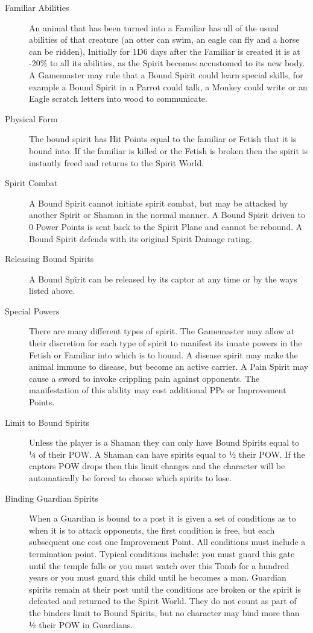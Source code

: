 \begin{rpg-spell}
\begin{description}
\item[Familiar Abilities] An animal that has been turned into a Familiar has all of the usual abilities of that creature (an otter can swim, an eagle can fly and a horse can be ridden), Initially for 1D6 days after the Familiar is created it is at -20\% to all its abilities, as the Spirit becomes accustomed to its new body. A Gamemaster may rule that a Bound Spirit could learn special skills, for example a Bound Spirit in a Parrot could talk, a Monkey could write or an Eagle scratch letters into wood to communicate.  
\item[Physical Form] The bound spirit has Hit Points equal to the familiar or Fetish that it is bound into. If the familiar is killed or the Fetish is broken then the spirit is instantly freed and returns to the Spirit World.
\item[Spirit Combat] A Bound Spirit cannot initiate spirit combat, but may be attacked by another Spirit or Shaman in the normal manner. A Bound Spirit driven to 0 Power Points is sent back to the Spirit Plane and cannot be rebound. A Bound Spirit defends with its original Spirit Damage rating.
\item[Releasing Bound Spirits] A Bound Spirit can be released by its captor at any time or by the ways listed above.
\item[Special Powers] There are many different types of spirit. The Gamemaster may allow at their discretion for each type of spirit to manifest its innate powers in the Fetish or Familiar into which is to bound. A disease spirit may make the animal immune to disease, but become an active carrier. A Pain Spirit may cause a sword to invoke crippling pain against opponents. The manifestation of this ability may cost additional PPs or Improvement Points.
\item[Limit to Bound Spirits] Unless the player is a Shaman they can only have Bound Spirits equal to ¼ of their POW. A Shaman can have spirits equal to ½ their POW. If the captors POW drops then this limit changes and the character will be automatically be forced to choose which spirits to lose.
\item[Binding Guardian Spirits] When a Guardian is bound to a post it is given a set of conditions as to when it is to attack opponents, the first condition is free, but each subsequent one cost one Improvement Point. All conditions must include a termination point. Typical conditions include: you must guard this gate until the temple falls or you must watch over this Tomb for a hundred years or you must guard this child until he becomes a man. Guardian spirits remain at their post until the conditions are broken or the spirit is defeated and returned to the Spirit World. They do not count as part of the binders limit to Bound Spirits, but no character may bind more than ½ their POW in Guardians. 
\end{description}
\end{rpg-spell}


